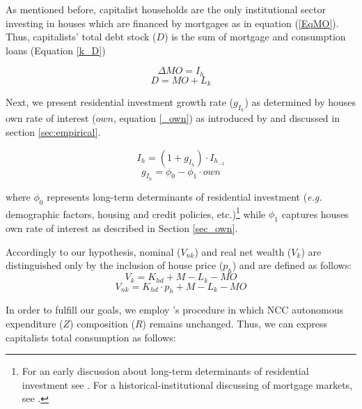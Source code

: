 \documentclass[12pt]{article}
\begin{document}
As mentioned before, capitalist households are the only institutional sector investing in houses which are financed by mortgages as in equation (\ref{EqMO}).
Thus, capitalists' total debt stock (\(D\)) is the sum of mortgage and consumption loans (Equation \ref{k_D})

\begin{equation}
  \label{EqMO}
  \Delta MO = I_h
\end{equation}
\begin{equation}
  \label{k_D}
  D =  MO + L_k
\end{equation}



Next, we present residential investment growth rate (\(g_{I_h}\)) as determined by houses own rate of interest (\(own\), equation \ref{_own}) as introduced by \textcite{teixeira_crescimento_2015} and discussed in section \ref{sec:empirical}.


\begin{equation}
	I_h = (1 + g_{I_h})\cdot I_{h_{-1}}
\end{equation}
\begin{equation}
	\label{g_Z_own}
	g_{I_h} = \phi_0 - \phi_1\cdot own
\end{equation}

where  \(\phi_0\) represents long-term determinants of residential investment (\emph{e.g.} demographic factors, housing and credit policies, etc.)\footnote{For an early discussion about long-term determinants of residential investment see \textcite{grebler_capital_1956}. For a historical-institutional discussing of mortgage markets, see \textcite{green_american_2005}.} while \(\phi_1\) captures houses own rate of interest as described in Section \ref{sec_own}.

Accordingly to our hypothesis, nominal (\(V_{nk}\)) and real net wealth (\(V_{k}\)) are distinguished only by the inclusion of house price (\(p_h\)) and are defined as follows:
\begin{equation}
V_{k} = K_{hd} + M - L_{k} - MO
\end{equation}
\begin{equation}
V_{nk} = K_{hd}\cdot p_h + M - L_{k} - MO
\end{equation}


In order to fulfill our goals, we employ \citeauthor*{freitas_baseline_2020}'s \citeyear{freitas_baseline_2020} procedure in which NCC autonomous expenditure (\(Z\)) composition (\(R\)) remains unchanged. Thus, we can express capitalists total consumption as follows:
\end{document}
